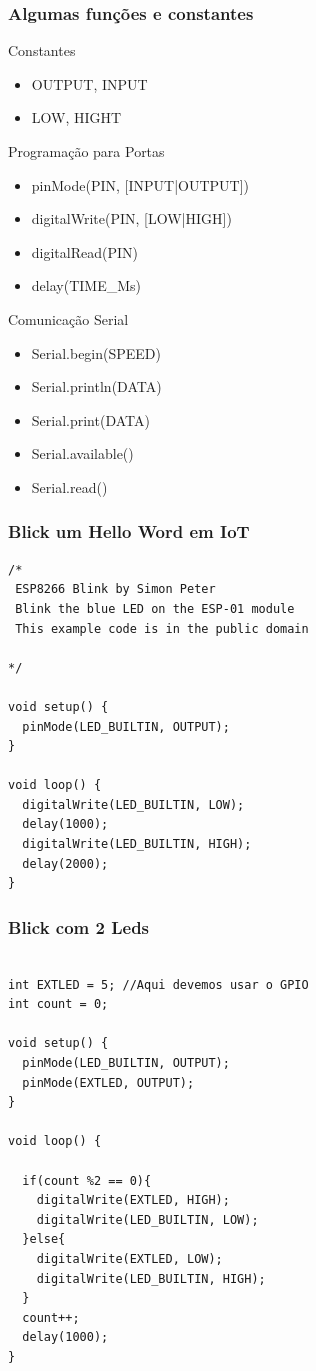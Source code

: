 \documentclass{beamer}
\begin{document}
\begin{frame}[fragile]
\frametitle{Algumas funções e constantes}

Constantes
\begin{itemize}
\item OUTPUT, INPUT
\item LOW, HIGHT
\end{itemize}

Programação para Portas
\begin{itemize}
\item pinMode(PIN, [INPUT|OUTPUT])
\item digitalWrite(PIN, [LOW|HIGH])
\item digitalRead(PIN)
\item delay(TIME\_Ms)
\end{itemize}

Comunicação Serial
\begin{itemize}
\item Serial.begin(SPEED)
\item Serial.println(DATA)
\item Serial.print(DATA)
\item Serial.available()
\item Serial.read()
\end{itemize}
\end{frame}





\begin{frame}[fragile]
\frametitle{Blick um Hello Word em IoT}

\scriptsize
\begin{lstlisting}
/*
 ESP8266 Blink by Simon Peter
 Blink the blue LED on the ESP-01 module
 This example code is in the public domain
 
*/

void setup() {
  pinMode(LED_BUILTIN, OUTPUT);     
}

void loop() {
  digitalWrite(LED_BUILTIN, LOW);   
  delay(1000);
  digitalWrite(LED_BUILTIN, HIGH);
  delay(2000);
}

\end{lstlisting}

\end{frame}


\begin{frame}[fragile]
\frametitle{Blick com 2 Leds}

\scriptsize
\begin{lstlisting}

int EXTLED = 5; //Aqui devemos usar o GPIO
int count = 0;

void setup() {
  pinMode(LED_BUILTIN, OUTPUT);     
  pinMode(EXTLED, OUTPUT);     
}

void loop() {
       
  if(count %2 == 0){
    digitalWrite(EXTLED, HIGH);
    digitalWrite(LED_BUILTIN, LOW);
  }else{
    digitalWrite(EXTLED, LOW);
    digitalWrite(LED_BUILTIN, HIGH);
  }
  count++;
  delay(1000);
}

\end{lstlisting}

\end{frame}
\end{document}
